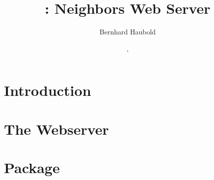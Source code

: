 \documentclass[a4paper]{report}
\begin{document}
\pagestyle{noweb}

\title{: Neighbors Web Server}
\author{Bernhard Haubold}
\date{\!\!, }
\maketitle
\tableofcontents
\chapter{Introduction}

\chapter{The Webserver}

\chapter{Package }


% 
\end{document}
